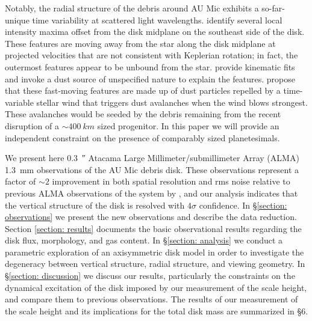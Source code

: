 \documentclass[modern]{aastex62}
\begin{document}
Notably, the radial structure of the debris around AU Mic exhibits a so-far-unique time variability at scattered light wavelengths.
\citet{boccaletti15,boccaletti18} identify several local intensity maxima offset from the disk midplane on the southeast side of the disk. 
These features are moving away from the star along the disk midplane at projected velocities that are not consistent with Keplerian rotation; in fact, the outermost features appear to be unbound from the star. 
\citet{sezestre17} provide kinematic fits and invoke a dust source of unspecified nature to explain the features.
\citet{chiang&fung17} propose that these fast-moving features are made up of dust particles repelled by a time-variable stellar wind that triggers dust avalanches when the wind blows strongest. 
These avalanches would be seeded by the debris remaining from the recent disruption of a $\sim \SI{400}{km}$ sized progenitor. 
In this paper we will provide an independent constraint on the presence of comparably sized planetesimals.

We present here \SI{0.3}{\arcsecond} Atacama Large Millimeter/submillimeter Array (ALMA) \SI{1.3}{mm} observations of the AU Mic debris disk. 
These observations represent a factor of $\sim 2$ improvement in both spatial resolution and rms noise relative to previous ALMA observations of the system by \citet{macgregor13}, and our analysis indicates that the vertical structure of the disk is resolved with $4 \sigma$ confidence.
In \S \ref{section: observations} we present the new observations and describe the data reduction.  
Section \ref{section: results} documents the basic observational results regarding the disk flux, morphology, and gas content.  
In \S \ref{section: analysis} we conduct a parametric exploration of an axisymmetric disk model in order to investigate the degeneracy between vertical structure, radial structure, and viewing geometry.
In \S \ref{section: discussion} we discuss our results, particularly the constraints on the dynamical excitation of the disk imposed by our measurement of the scale height, and compare them to previous observations.
The results of our measurement of the scale height and its implications for the total disk mass are summarized in \S 6.
\end{document}
